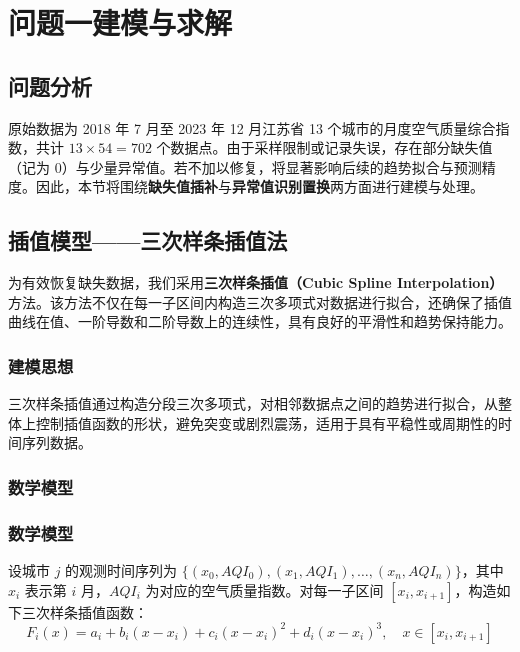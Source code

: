 \documentclass[a4paper,12pt]{article}
\begin{document}
	
	\section{问题一建模与求解}
	
	\subsection{问题分析}
	
	原始数据为 2018 年 7 月至 2023 年 12 月江苏省 13 个城市的月度空气质量综合指数，共计 $13 \times 54 = 702$ 个数据点。由于采样限制或记录失误，存在部分缺失值（记为 0）与少量异常值。若不加以修复，将显著影响后续的趋势拟合与预测精度。因此，本节将围绕\textbf{缺失值插补}与\textbf{异常值识别置换}两方面进行建模与处理。
	
	\subsection{插值模型——三次样条插值法}
	
	为有效恢复缺失数据，我们采用\textbf{三次样条插值（Cubic Spline Interpolation）}方法。该方法不仅在每一子区间内构造三次多项式对数据进行拟合，还确保了插值曲线在值、一阶导数和二阶导数上的连续性，具有良好的平滑性和趋势保持能力。
	
	\subsubsection{建模思想}
	
	三次样条插值通过构造分段三次多项式，对相邻数据点之间的趋势进行拟合，从整体上控制插值函数的形状，避免突变或剧烈震荡，适用于具有平稳性或周期性的时间序列数据。
	
	\subsubsection{数学模型}
	
\subsubsection{数学模型}

设城市 $j$ 的观测时间序列为 $\{(x_0, AQI_0), (x_1, AQI_1), \dots, (x_n, AQI_n)\}$，其中 $x_i$ 表示第 $i$ 月，$AQI_i$ 为对应的空气质量指数。对每一子区间 $[x_i, x_{i+1}]$，构造如下三次样条插值函数：
\begin{equation}
	F_i(x) = a_i + b_i(x - x_i) + c_i(x - x_i)^2 + d_i(x - x_i)^3, \quad x \in [x_i, x_{i+1}]
\end{equation}
\end{document}
